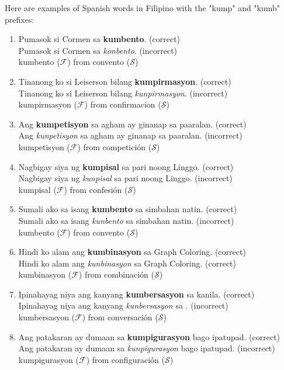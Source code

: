\begin{example}
      Here are examples of Spanish words in Filipino with the "kump" and "kumb"
      prefixes:
\end{example}
\begin{enumerate}
      \item Pumasok si Cormen sa \textbf{kumbento}. (correct) \\
            Pumasok si Cormen sa \textit{konbento}. (incorrect) \\
            kumbento (\(\mathcal{F}\)) from convento (\(\mathcal{S}\))
      \item Tinanong ko si Leiserson bilang \textbf{kumpirmasyon}. (correct) \\
            Tinanong ko si Leiserson bilang \textit{kunpirmasyon}. (incorrect) \\
            kumpirmasyon (\(\mathcal{F}\)) from confirmacion (\(\mathcal{S}\))
      \item Ang \textbf{kumpetisyon} sa agham ay ginanap sa paaralan. (correct) \\
            Ang \textit{kunpetisyon} sa agham ay ginanap sa paaralan. (incorrect) \\
            kumpetisyon (\(\mathcal{F}\)) from competición (\(\mathcal{S}\))
      \item Nagbigay siya ng \textbf{kumpisal} sa pari noong Linggo. (correct) \\
            Nagbigay siya ng \textit{kunpisal} sa pari noong Linggo. (incorrect) \\
            kumpisal (\(\mathcal{F}\)) from confesión (\(\mathcal{S}\))
      \item Sumali ako sa isang \textbf{kumbento} sa simbahan natin. (correct) \\
            Sumali ako sa isang \textit{kunbento} sa simbahan natin. (incorrect) \\
            kumbento (\(\mathcal{F}\)) from convento (\(\mathcal{S}\))
      \item Hindi ko alam ang \textbf{kumbinasyon} sa Graph Coloring. (correct) \\
            Hindi ko alam ang \textit{kunbinasyon} sa Graph Coloring. (correct) \\
            kumbinasyon (\(\mathcal{F}\)) from combinación (\(\mathcal{S}\))
      \item Ipinahayag niya ang kanyang \textbf{kumbersasyon} sa kanila. (correct) \\
            Ipinahayag niya ang kanyang \textit{kunbersasyon} sa . (incorrect) \\
            kumbersasyon (\(\mathcal{F}\)) from conversación (\(\mathcal{S}\))
      \item Ang patakaran ay dumaan sa \textbf{kumpigurasyon} bago ipatupad. (correct) \\
            Ang patakaran ay dumaan sa \textit{kunpigurasyon} bago ipatupad. (incorrect) \\
            kumpigurasyon (\(\mathcal{F}\)) from configuración (\(\mathcal{S}\))
\end{enumerate}

